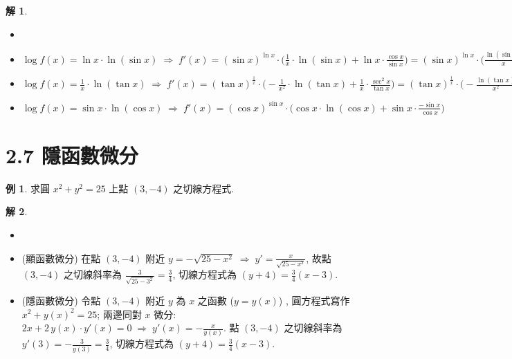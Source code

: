 \documentclass[12pt]{extarticle}
\newcommand{\ds}{\displaystyle}
\newcommand{\ie}{\;\Longrightarrow\;}
\theoremstyle{definition}
\newtheorem*{ex}{例}
\newtheorem*{sol}{解}
\begin{document}
\begin{sol}
  \begin{itemize}\setlength\itemsep{0em}
    \item[]
    \item $\ds\log f(x) = \ln x\cdot\ln(\sin x)\ie f'(x) = (\sin x)^{\ln x}\cdot\Big(\frac{1}{x}\cdot\ln(\sin x) + \ln x\cdot\frac{\cos x}{\sin x}\Big) = (\sin x)^{\ln x}\cdot\Big(\frac{\ln(\sin x)}{x} + \ln x\cdot\cot x\Big)$
    \item $\ds\log f(x) = \frac{1}{x}\cdot\ln(\tan x)\ie f'(x) = (\tan x)^{\frac{1}{x}}\cdot\Big(-\frac{1}{x^2}\cdot\ln(\tan x) + \frac{1}{x}\cdot\frac{\sec^2 x}{\tan x}\Big) = (\tan x)^{\frac{1}{x}}\cdot\Big(-\frac{\ln(\tan x)}{x^2} + \frac{\sec x\csc x}{x}\Big)$
    \item $\ds\log f(x) = \sin x\cdot\ln(\cos x)\ie f'(x) = (\cos x)^{\sin x}\cdot\Big(\cos x\cdot\ln(\cos x) + \sin x\cdot\frac{-\sin x}{\cos x}\Big)$
  \end{itemize}
\end{sol}

\section*{2.7 隱函數微分}

\begin{ex}
  求圓 $x^2 + y^2 = 25$ 上點 $(3, -4)$ 之切線方程式. 
\end{ex}

\begin{sol}
  \begin{itemize}\setlength\itemsep{0em}
    \item[]
    \item (顯函數微分) 在點 $(3, -4)$ 附近 $\ds y = -\sqrt{25 - x^2}\ie y' = \frac{x}{\sqrt{25 - x^2}}$, 故點 $(3, -4)$ 之切線斜率為 $\ds\frac{3}{\sqrt{25 - 3^2}} = \frac{3}{4}$, 切線方程式為 $\ds(y + 4) = \frac{3}{4}(x - 3)$.  
    \item (隱函數微分) 令點 $(3, -4)$ 附近 $y$ 為 $x$ 之函數 ($y = y(x)$) , 圓方程式寫作 $\ds x^2 + y(x)^2 = 25$; 兩邊同對 $x$ 微分: $\ds 2x + 2\,y(x)\cdot y'(x) = 0 \ie y'(x) = -\frac{x}{y(x)}$. 點 $(3, -4)$ 之切線斜率為 $\ds y'(3) = -\frac{3}{y(3)} = \frac{3}{4}$, 切線方程式為 $\ds(y + 4) = \frac{3}{4}(x - 3)$. 
  \end{itemize}
\end{sol}
\end{document}
